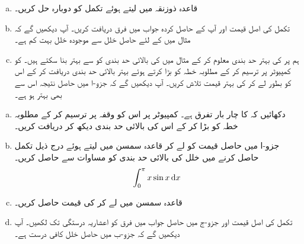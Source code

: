 \begin{enumerate}[a.]
\item
قاعدہ ذوزنقہ میں  لیتے ہوئے تکمل کو دوبارہ حل کریں۔
\item
تکمل کی اصل قیمت  اور آپ کے حاصل کردہ جواب میں فرق دریافت کریں۔ آپ دیکھیں گے کہ  مثال  میں کے لئے حاصل خلل  سے موجودہ خلل بہت کم ہے۔
\item
ہم   پر کی بہتر حد بندی معلوم کر کے  مثال  میں  کی بالائی حد بندی کو  سے بہتر بنا سکتے ہیں۔  کو کمپیوٹر پر ترسیم کر کے مطلوبہ خطہ کو بڑا کرتے ہوئے بہتر بالائی حد بندی دریافت کر کے اس کو بطور  لے کر کی بہتر قیمت تلاش کریں۔ آپ دیکھیں گے کہ جزو-ا میں حاصل نتیجہ اس سے بھی بہتر ہو ہے۔
\end{enumerate}
\begin{enumerate}[a.]
\item
دکھائیں کہ  کا چار بار تفرق  ہے۔ کمپیوٹر پر اس کو وقفہ  پر ترسیم کر کے مطلوبہ خطہ کو بڑا کر کے اس کی بالائی حد بندی دیکھ کر دریافت کریں۔
\item
جزو-ا میں حاصل قیمت کو  لے کر قاعدہ سمسن میں  لیتے ہوئے  درج ذیل تکمل حاصل کرنے میں خلل کی بالائی حد بندی  کو  مساوات  سے حاصل کریں۔
\begin{align*}
\int_0^{\pi}x\sin x\dif x
\end{align*}
\item
قاعدہ سمسن میں  لے کر  کی قیمت حاصل کریں۔
\item
تکمل کی اصل قیمت  اور جزو-ج میں حاصل جواب میں فرق کو  اعشاریہ درستگی تک لکھیں۔ آپ دیکھیں گے کہ جزو-ب میں حاصل خلل کافی درست ہے۔
\end{enumerate}
